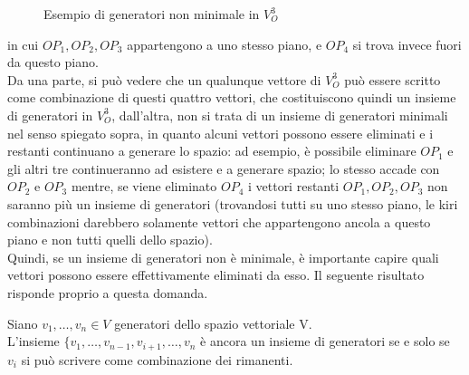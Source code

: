 \begin{figure}[ht!]
  \centering
  \resizebox{5cm}{!}{
    
  }
  \caption{Esempio di generatori non minimale in $V_O^3$}
  \label{fig:generatoriNonMinInVO3}
\end{figure}
in cui $OP_1,OP_2,OP_3$ appartengono a uno stesso piano, e $OP_4$ si trova invece fuori da questo piano.\\
Da una parte, si può vedere che un qualunque vettore di $V_O^3$ può essere scritto come combinazione di questi quattro vettori, che costituiscono quindi un insieme di generatori in $V_O^3$, dall'altra, non si trata di un insieme di generatori minimali nel senso spiegato sopra, in quanto alcuni vettori possono essere eliminati e i restanti continuano a generare lo spazio: ad esempio, è possibile eliminare $OP_1$ e gli altri tre continueranno ad esistere e a generare spazio; lo stesso accade con $OP_2$ e $OP_3$ mentre, se viene eliminato $OP_4$ i vettori restanti $OP_1,OP_2,OP_3$ non saranno più un insieme di generatori (trovandosi tutti su uno stesso piano, le kiri combinazioni darebbero solamente vettori che appartengono ancola a questo piano e non tutti quelli dello spazio).\\
Quindi, se un insieme di generatori non è minimale, è importante capire quali vettori possono essere effettivamente eliminati da esso. Il seguente risultato risponde proprio a questa domanda.
\begin{prop}
  \label{prop:spaziovect1}
  Siano $v_1,\dots,v_n\in V$ generatori dello spazio vettoriale V.\\
  L'insieme $\{v_1,\dots,v_{n-1}, v_{i+1},\dots,v_n$ è ancora un insieme di generatori se e solo se $v_i$ si può scrivere come combinazione dei rimanenti.
\end{prop}
